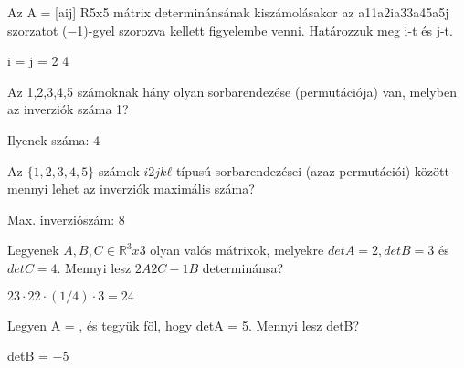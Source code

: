 \begin{frame}
  \begin{tcolorbox}[title={7/2. -R-}]
    Az A = [aij] \in R5x5 mátrix determinánsának kiszámolásakor az a11a2ia33a45a5j szorzatot (−1)-gyel szorozva kellett ﬁgyelembe venni. Határozzuk meg i-t és j-t.
  \tcblower

    \mmedskip 
    
    i = j =
2 4
  \end{tcolorbox}
\end{frame}


\begin{frame}
  \begin{tcolorbox}[title={7/3. -Q-}]
    Az {1,2,3,4,5} számoknak hány olyan sorbarendezése (permutációja) van, melyben az inverziók száma 1?
  \tcblower

    \mmedskip 
    
     Ilyenek száma: 4
  \end{tcolorbox}
\end{frame}


\begin{frame}
  \begin{tcolorbox}[title={7/4. -Q-}]
    Az $\{1,2,3,4,5\}$ számok $i2jkℓ$ típusú sorbarendezései (azaz permutációi) között mennyi lehet az inverziók maximális száma?
  \tcblower

    \mmedskip 
    Max. inverziószám: 8
  \end{tcolorbox}
\end{frame}

\begin{frame}
  \begin{tcolorbox}[title={7/5. -N-}]
    Legyenek $A,B,C \in \mathbb{R}^3x3$ olyan valós mátrixok, melyekre $detA = 2, detB = 3$ és $detC = 4$. Mennyi lesz $2A2C−1B$ determinánsa?
  \tcblower

    \mmedskip 
    
     $23  \cdot 22  \cdot (1/4) \cdot 3 = 24$
  \end{tcolorbox}
\end{frame}

\begin{frame}
  \begin{tcolorbox}[title={7/6. -R-}]
    Legyen A =
, és
tegyük föl, hogy detA = 5. Mennyi lesz detB?

  \tcblower

    \mmedskip 
    
     detB = −5
  \end{tcolorbox}
\end{frame}


